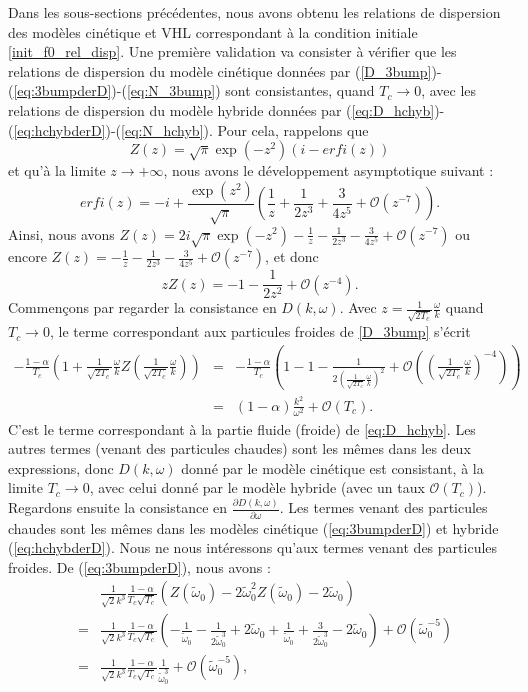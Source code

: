Dans les sous-sections précédentes, nous avons obtenu les relations de dispersion des modèles cinétique et VHL correspondant à la condition initiale \eqref{init_f0_rel_disp}. Une première validation va consister à vérifier que les relations de dispersion du modèle cinétique données par (\ref{D_3bump})-(\ref{eq:3bumpderD})-(\ref{eq:N_3bump}) sont consistantes, quand $T_c\to 0$, avec les relations de dispersion du modèle hybride données par (\ref{eq:D_hchyb})-(\ref{eq:hchybderD})-(\ref{eq:N_hchyb}). Pour cela, rappelons que 
$$
  Z(z)=\sqrt{\pi} \exp(-z^2) (i - erfi(z) )
$$
et qu'à la limite $z\to+\infty$, nous avons le développement asymptotique suivant :
$$
  erfi(z) = -i + \frac{\exp(z^2)}{\sqrt{\pi}} \left(\frac{1}{z} +\frac{1}{2z^3} +\frac{3}{4z^5} + \mathcal{O}\left(z^{-7}\right) \right).
$$
Ainsi, nous avons $Z(z) =  2 i \sqrt{\pi} \exp(-z^2)  - \frac{1}{z}  - \frac{1}{2z^3} - \frac{3}{4z^5}+ \mathcal{O}\left(z^{-7}\right)$ ou encore $Z(z)= - \frac{1}{z}  - \frac{1}{2z^3}- \frac{3}{4z^5}+ \mathcal{O}\left(z^{-7}\right)$, et donc
$$
  zZ(z)=-1-\frac{1}{2z^2} + \mathcal{O}\left(z^{-4}\right).
$$
Commençons par regarder la consistance en $D(k,\omega)$. Avec $z=\frac{1}{\sqrt{2T_c}}\frac{\omega}{k}$ quand $T_c\to 0$, le terme correspondant aux particules froides de \eqref{D_3bump} s'écrit
\begin{eqnarray*}
  -\frac{1-\alpha}{T_c}\left(1+\frac{1}{\sqrt{2T_c}}\frac{\omega}{k}Z\left(\frac{1}{\sqrt{2T_c}}\frac{\omega}{k}\right)\right)&=&-\frac{1-\alpha}{T_c}\left(1-1-\frac{1}{2\left(\frac{1}{\sqrt{2T_c}}\frac{\omega}{k}\right)^2}+ \mathcal{O}\left(\left(\frac{1}{\sqrt{2T_c}}\frac{\omega}{k}\right)^{-4}\right)\right)\nonumber\\
  &=& \left(1-\alpha\right)\frac{k^2}{\omega^2} + \mathcal{O}(T_c). 
\end{eqnarray*}
C'est le terme correspondant à la partie fluide (froide) de \eqref{eq:D_hchyb}. Les autres termes (venant des particules chaudes) sont les mêmes dans les deux expressions, donc $D(k,\omega)$ donné par le modèle cinétique est consistant, à la limite $T_c\to 0$, avec celui donné par le modèle hybride (avec un taux $\mathcal{O}(T_c)$). Regardons ensuite la consistance en $\frac{\partial D(k,\omega)}{\partial \omega}$. Les termes venant des particules chaudes sont les mêmes dans les modèles cinétique (\ref{eq:3bumpderD}) et hybride (\ref{eq:hchybderD}). Nous ne nous intéressons qu'aux termes venant des particules froides. De (\ref{eq:3bumpderD}), nous avons :
\begin{eqnarray*}
  &&\frac{1}{\sqrt{2}k^3}\frac{1-\alpha}{T_c\sqrt{T_c}}\left(Z\left(\tilde{\omega}_0\right)-2\tilde{\omega}_0^2Z\left(\tilde{\omega}_0\right)-2\tilde{\omega}_0\right)\\
  &=&\frac{1}{\sqrt{2}k^3}\frac{1-\alpha}{T_c\sqrt{T_c}}\left(-\frac{1}{\tilde{\omega}_0}-\frac{1}{2\tilde{\omega}_0^3}+2\tilde{\omega}_0+\frac{1}{\tilde{\omega}_0}+\frac{3}{2\tilde{\omega}_0^3}-2\tilde{\omega}_0\right)+\mathcal{O}\left(\tilde{\omega}_0^{-5}\right)\\
  &=&\frac{1}{\sqrt{2}k^3}\frac{1-\alpha}{T_c\sqrt{T_c}}\frac{1}{\tilde{\omega}_0^3}+\mathcal{O}\left(\tilde{\omega}_0^{-5}\right),
\end{eqnarray*}
